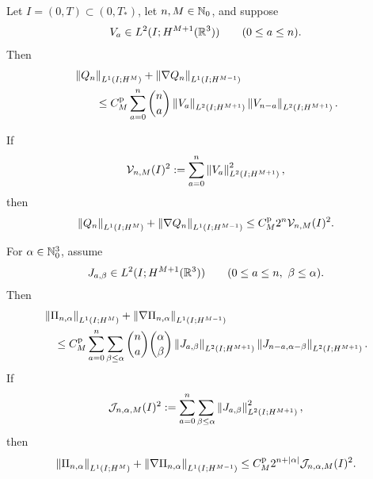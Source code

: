 \begin{theorem}
\label{u:thm:formal-finite-row-pressure}
Let \(I=(0,T)\subset(0,T_*)\), let \(n,M\in\mathbb N_0\), and suppose
\[
 V_a\in L^2(I;H^{M+1}(\mathbb R^3))
 \qquad(0\le a\le n).
\]
Then
\begin{align}
 &\left\lVert Q_n\right\rVert_{L^1(I;H^M)}
 +\left\lVert \nabla Q_n\right\rVert_{L^1(I;H^{M-1})}
 \notag\\
 &\qquad\le
 C_M^{\rm p}\sum_{a=0}^{n}\binom na
 \left\lVert V_a\right\rVert_{L^2(I;H^{M+1})}
 \left\lVert V_{n-a}\right\rVert_{L^2(I;H^{M+1})}.
 \label{u:eq:formal-finite-pressure-L1}
\end{align}
\begin{samepage}
If
\[
 \mathcal V_{n,M}(I)^2
 :=\sum_{a=0}^{n}
 \left\lVert V_a\right\rVert_{L^2(I;H^{M+1})}^2,
\]
then
\begin{equation}
 \left\lVert Q_n\right\rVert_{L^1(I;H^M)}
 +\left\lVert \nabla Q_n\right\rVert_{L^1(I;H^{M-1})}
 \le C_M^{\rm p}2^n\mathcal V_{n,M}(I)^2.
 \label{u:eq:formal-finite-pressure-compressed}
\end{equation}
\end{samepage}
For \(\alpha\in\mathbb N_0^3\), assume
\[
 J_{a,\beta}\in L^2(I;H^{M+1}(\mathbb R^3))
 \qquad
 (0\le a\le n,\ \beta\le\alpha).
\]
Then
\begin{align}
 &\left\lVert \Pi_{n,\alpha}\right\rVert_{L^1(I;H^M)}
 +\left\lVert \nabla\Pi_{n,\alpha}\right\rVert_{L^1(I;H^{M-1})}
 \notag\\
 &\quad\le
 C_M^{\rm p}
 \sum_{a=0}^{n}\sum_{\beta\le\alpha}
 \binom na\binom{\alpha}{\beta}
 \left\lVert J_{a,\beta}\right\rVert_{L^2(I;H^{M+1})}
 \left\lVert J_{n-a,\alpha-\beta}\right\rVert_{L^2(I;H^{M+1})}.
 \label{u:eq:formal-finite-mixed-pressure-L1}
\end{align}
If
\[
 \mathcal J_{n,\alpha,M}(I)^2
 :=
 \sum_{a=0}^{n}\sum_{\beta\le\alpha}
 \left\lVert J_{a,\beta}\right\rVert_{L^2(I;H^{M+1})}^2,
\]
then
\begin{equation}
 \left\lVert \Pi_{n,\alpha}\right\rVert_{L^1(I;H^M)}
 +\left\lVert \nabla\Pi_{n,\alpha}\right\rVert_{L^1(I;H^{M-1})}
 \le
 C_M^{\rm p}2^{n+|\alpha|}
 \mathcal J_{n,\alpha,M}(I)^2.
 \label{u:eq:formal-finite-mixed-pressure-compressed}
\end{equation}
\end{theorem}

